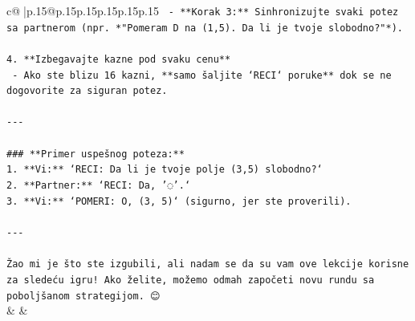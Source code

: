 \documentclass{article}
\begin{document}
{\begin{supertabular}{c@{$\;$}|p{.15\linewidth}@{}p{.15\linewidth}p{.15\linewidth}p{.15\linewidth}p{.15\linewidth}p{.15\linewidth}}
{{{\texttt{   {-} **Korak 3:** Sinhronizujte svaki potez sa partnerom (npr. *"Pomeram D na (1,5). Da li je tvoje slobodno?"*).} \\
\\ 
\texttt{4. **Izbegavajte kazne pod svaku cenu**} \\
\texttt{   {-} Ako ste blizu 16 kazni, **samo šaljite `RECI` poruke** dok se ne dogovorite za siguran potez.} \\
\\ 
\texttt{{-}{-}{-}} \\
\\ 
\texttt{\#\#\# **Primer uspešnog poteza:**} \\
\texttt{1. **Vi:** `RECI: Da li je tvoje polje (3,5) slobodno?`} \\
\texttt{2. **Partner:** `RECI: Da, '◌'.`} \\
\texttt{3. **Vi:** `POMERI: O, (3, 5)` (sigurno, jer ste proverili).} \\
\\ 
\texttt{{-}{-}{-}} \\
\\ 
\texttt{Žao mi je što ste izgubili, ali nadam se da su vam ove lekcije korisne za sledeću igru! Ako želite, možemo odmah započeti novu rundu sa poboljšanom strategijom. 😊} \\
            }
        }
    }
    & & \\ \\


\end{supertabular}}
\end{document}
